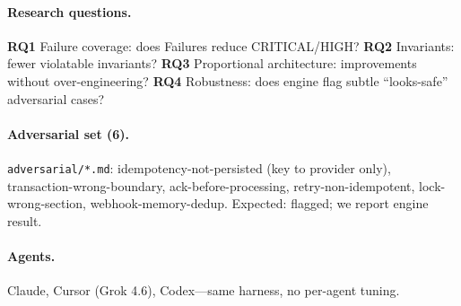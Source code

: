 \paragraph{Research questions.}
\textbf{RQ1} Failure coverage: does Failures reduce CRITICAL/HIGH?
\textbf{RQ2} Invariants: fewer violatable invariants?
\textbf{RQ3} Proportional architecture: improvements without over-engineering?
\textbf{RQ4} Robustness: does engine flag subtle ``looks-safe'' adversarial cases?

\paragraph{Adversarial set (6).} \texttt{adversarial/*.md}: idempotency-not-persisted (key to provider only), transaction-wrong-boundary, ack-before-processing, retry-non-idempotent, lock-wrong-section, webhook-memory-dedup. Expected: flagged; we report engine result.

\paragraph{Agents.} Claude, Cursor (Grok 4.6), Codex---same harness, no per-agent tuning.
